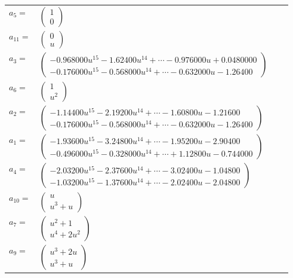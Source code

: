 \documentclass[1p]{elsarticle_modified}
\theoremstyle{definition}
\begin{document}
\begin{tabular}{m{7pt} m{180pt} m{7pt} m{180pt} }
\flushright $a_{5}=$&$\begin{pmatrix}1\\0\end{pmatrix}$ \\
\flushright $a_{11}=$&$\begin{pmatrix}0\\u\end{pmatrix}$ \\
\flushright $a_{3}=$&$\begin{pmatrix}-0.968000 u^{15}-1.62400 u^{14}+\cdots-0.976000 u+0.0480000\\-0.176000 u^{15}-0.568000 u^{14}+\cdots-0.632000 u-1.26400\end{pmatrix}$ \\
\flushright $a_{6}=$&$\begin{pmatrix}1\\u^2\end{pmatrix}$ \\
\flushright $a_{2}=$&$\begin{pmatrix}-1.14400 u^{15}-2.19200 u^{14}+\cdots-1.60800 u-1.21600\\-0.176000 u^{15}-0.568000 u^{14}+\cdots-0.632000 u-1.26400\end{pmatrix}$ \\
\flushright $a_{1}=$&$\begin{pmatrix}-1.93600 u^{15}-3.24800 u^{14}+\cdots-1.95200 u-2.90400\\-0.496000 u^{15}-0.328000 u^{14}+\cdots+1.12800 u-0.744000\end{pmatrix}$ \\
\flushright $a_{4}=$&$\begin{pmatrix}-2.03200 u^{15}-2.37600 u^{14}+\cdots-3.02400 u-1.04800\\-1.03200 u^{15}-1.37600 u^{14}+\cdots-2.02400 u-2.04800\end{pmatrix}$ \\
\flushright $a_{10}=$&$\begin{pmatrix}u\\u^3+u\end{pmatrix}$ \\
\flushright $a_{7}=$&$\begin{pmatrix}u^2+1\\u^4+2 u^2\end{pmatrix}$ \\
\flushright $a_{9}=$&$\begin{pmatrix}u^3+2 u\\u^3+u\end{pmatrix}$ \\

\end{tabular}
\end{document}
